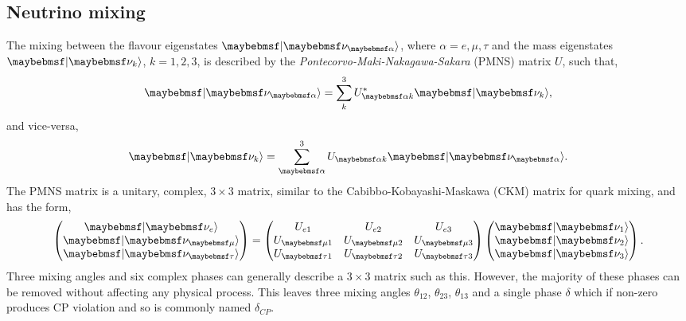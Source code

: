 \subsection{Neutrino mixing} %
\label{sec:theory_oscillations_mixing} %

The mixing between the flavour eigenstates $\ket{\nu_{\alpha}}$, where $\alpha=e,\mu,\tau$ and the
mass eigenstates $\ket{\nu_{k}}$, $k=1,2,3$, is described by the
\emph{Pontecorvo-Maki-Nakagawa-Sakara} (PMNS) matrix $U$, such that,
\begin{equation} %
    \ket{\nu_{\alpha}}=\sum_{k}^{3}U_{\alpha k}^{*}\ket{\nu_{k}},
\end{equation}
and vice-versa,
\begin{equation} %
    \ket{\nu_{k}}=\sum_{\alpha}^{3}U_{\alpha k}\ket{\nu_{\alpha}}.
\end{equation}
The PMNS matrix is a unitary, complex, $3\times3$ matrix, similar to the Cabibbo-Kobayashi-Maskawa
(CKM) matrix for quark mixing, and has the form,
\begin{gather} %
    \begin{pmatrix}
        \ket{\nu_{e}}   \\
        \ket{\nu_{\mu}} \\
        \ket{\nu_{\tau}}
    \end{pmatrix}
    =
    \begin{pmatrix}
        U_{e1}     & U_{e2}     & U_{e3}     \\
        U_{\mu 1}  & U_{\mu 2}  & U_{\mu 3}  \\
        U_{\tau 1} & U_{\tau 2} & U_{\tau 3}
    \end{pmatrix}
    \begin{pmatrix}
        \ket{\nu_{1}} \\
        \ket{\nu_{2}} \\
        \ket{\nu_{3}}
    \end{pmatrix}.
\end{gather} %
Three mixing angles and six complex phases can generally describe a $3\times3$ matrix such as
this. However, the majority of these phases can be removed without affecting any physical process.
This leaves three mixing angles $\theta_{12}$, $\theta_{23}$, $\theta_{13}$ and a single phase
$\delta$ which if non-zero produces CP violation and so is commonly named $\delta_{CP}$.

